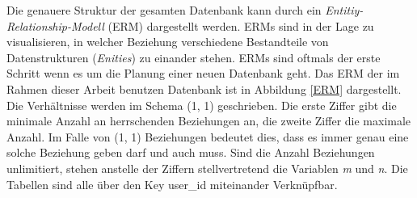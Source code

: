 \documentclass[a4paper,11pt]{report}
\begin{document}
				Die genauere Struktur der gesamten Datenbank kann durch ein \emph{Entitiy-Relationship-Modell} (ERM) dargestellt werden. ERMs sind in der Lage zu visualisieren, in welcher Beziehung verschiedene Bestandteile von Datenstrukturen (\emph{Enities}) zu einander stehen. ERMs sind oftmals der erste Schritt wenn es um die Planung einer neuen Datenbank geht. Das ERM der im Rahmen dieser Arbeit benutzen Datenbank ist in Abbildung \ref{ERM} dargestellt. Die Verhältnisse werden im Schema (1, 1) geschrieben. Die erste Ziffer gibt die minimale Anzahl an herrschenden Beziehungen an, die zweite Ziffer die maximale Anzahl. Im Falle von (1, 1) Beziehungen bedeutet dies, dass es immer genau eine solche Beziehung geben darf und auch muss. Sind die Anzahl Beziehungen unlimitiert, stehen anstelle der Ziffern stellvertretend die Variablen \emph{m} und \emph{n}. Die Tabellen sind alle über den Key user\_id miteinander Verknüpfbar.\cite[S. 750]{IT-Handbuch} \cite{ERM} \cite{ERM2}
				
				
				
\end{document}
